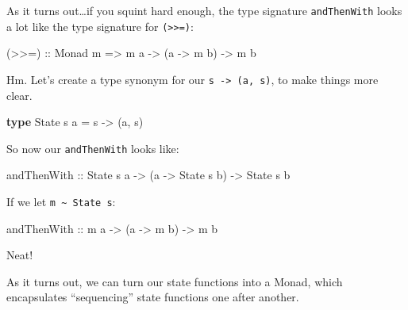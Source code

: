\documentclass[]{article}
\newenvironment{Shaded}{}{}
\newcommand{\DataTypeTok}[1]{\textcolor[rgb]{0.56,0.13,0.00}{#1}}
\newcommand{\KeywordTok}[1]{\textcolor[rgb]{0.00,0.44,0.13}{\textbf{#1}}}
\newcommand{\NormalTok}[1]{#1}
\newcommand{\OtherTok}[1]{\textcolor[rgb]{0.00,0.44,0.13}{#1}}
\begin{document}
As it turns out\ldots if you squint hard enough, the type signature
\texttt{andThenWith} looks a lot like the type signature for
\texttt{(\textgreater{}\textgreater{}=)}:

\begin{Shaded}
\begin{Highlighting}[]
\OtherTok{(\textgreater{}\textgreater{}=) ::} \DataTypeTok{Monad}\NormalTok{ m }\OtherTok{=\textgreater{}}\NormalTok{ m a }\OtherTok{{-}\textgreater{}}\NormalTok{ (a }\OtherTok{{-}\textgreater{}}\NormalTok{ m b) }\OtherTok{{-}\textgreater{}}\NormalTok{ m b}
\end{Highlighting}
\end{Shaded}

Hm. Let's create a type synonym for our \texttt{s\ -\textgreater{}\ (a,\ s)}, to
make things more clear.

\begin{Shaded}
\begin{Highlighting}[]
\KeywordTok{type} \DataTypeTok{State}\NormalTok{ s a }\OtherTok{=}\NormalTok{ s }\OtherTok{{-}\textgreater{}}\NormalTok{ (a, s)}
\end{Highlighting}
\end{Shaded}

So now our \texttt{andThenWith} looks like:

\begin{Shaded}
\begin{Highlighting}[]
\OtherTok{andThenWith ::} \DataTypeTok{State}\NormalTok{ s a }\OtherTok{{-}\textgreater{}}\NormalTok{ (a }\OtherTok{{-}\textgreater{}} \DataTypeTok{State}\NormalTok{ s b) }\OtherTok{{-}\textgreater{}} \DataTypeTok{State}\NormalTok{ s b}
\end{Highlighting}
\end{Shaded}

If we let \texttt{m\ \textasciitilde{}\ State\ s}:

\begin{Shaded}
\begin{Highlighting}[]
\OtherTok{andThenWith ::}\NormalTok{ m a }\OtherTok{{-}\textgreater{}}\NormalTok{ (a }\OtherTok{{-}\textgreater{}}\NormalTok{ m b) }\OtherTok{{-}\textgreater{}}\NormalTok{ m b}
\end{Highlighting}
\end{Shaded}

Neat!

As it turns out, we can turn our state functions into a Monad, which
encapsulates ``sequencing'' state functions one after another.
\end{document}

